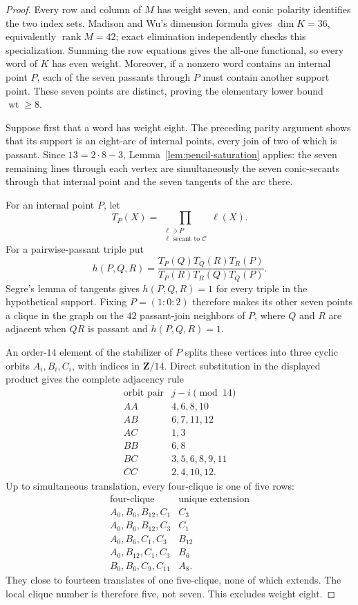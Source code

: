\documentclass[11pt]{article}
\theoremstyle{remark}
\newcommand{\cC}{\mathcal{C}}
\begin{document}
\begin{proof}
Every row and column of $M$ has weight seven, and conic polarity identifies
the two index sets.  Madison and Wu's dimension formula gives
$\dim K=36$, equivalently $\operatorname{rank}M=42$; exact elimination
independently checks this specialization.
Summing the row equations gives the all-one functional, so every word of
$K$ has even weight.  Moreover, if a nonzero word contains an internal
point $P$, each of the seven passants through $P$ must contain another
support point.  These seven points are distinct, proving the elementary
lower bound $\operatorname{wt}\ge8$.

Suppose first that a word has weight eight.  The preceding parity argument
shows that its support is an eight-arc of internal points, every join of
two of which is passant.  Since $13=2\cdot8-3$,
Lemma~\ref{lem:pencil-saturation} applies: the seven remaining lines
through each vertex are simultaneously the seven conic-secants through that
internal point and the seven tangents of the arc there.

For an internal point $P$, let
\[
 T_P(X)=\prod_{\substack{\ell\ni P\\
                         \ell\text{ secant to }\cC}}\ell(X).
\]
For a pairwise-passant triple put
\[
 h(P,Q,R)=
 \frac{T_P(Q)T_Q(R)T_R(P)}
      {T_P(R)T_R(Q)T_Q(P)}.
\]
Segre's lemma of tangents
\cite[Lemma~27]{BallLavrauw2019} gives $h(P,Q,R)=1$ for every triple in the
hypothetical support.  Fixing $P=(1:0:2)$ therefore makes its other seven
points a clique in the graph on the $42$ passant-join neighbors of $P$,
where $Q$ and $R$ are adjacent when $QR$ is passant and $h(P,Q,R)=1$.

An order-$14$ element of the stabilizer of $P$ splits these vertices into
three cyclic orbits $A_i,B_i,C_i$, with indices in $\mathbf Z/14$.  Direct
substitution in the displayed product gives the complete adjacency rule
\[
\begin{array}{c|c}
\text{orbit pair}&j-i\pmod {14}\\ \hline
AA&4,6,8,10\\
AB&6,7,11,12\\
AC&1,3\\
BB&6,8\\
BC&3,5,6,8,9,11\\
CC&2,4,10,12.
\end{array}
\]
Up to simultaneous translation, every four-clique is one of five rows:
\[
\begin{array}{c|c}
\text{four-clique}&\text{unique extension}\\ \hline
A_0,B_6,B_{12},C_1&C_3\\
A_0,B_6,B_{12},C_3&C_1\\
A_0,B_6,C_1,C_3&B_{12}\\
A_0,B_{12},C_1,C_3&B_6\\
B_0,B_6,C_9,C_{11}&A_8.
\end{array}
\]
They close to fourteen translates of one five-clique, none of which
extends.  The local clique number is therefore five, not seven.  This
excludes weight eight.


\end{proof}
\end{document}
